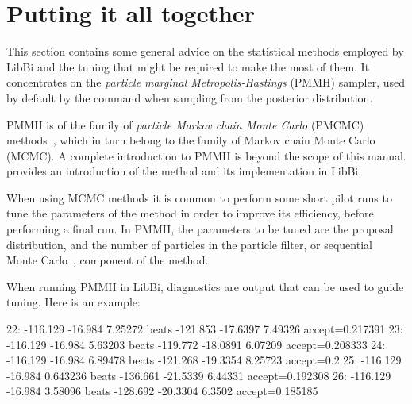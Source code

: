 \section{Putting it all together\label{Putting it all together}}

This section contains some general advice on the statistical methods employed
by LibBi and the tuning that might be required to make the most of them. It
concentrates on the \emph{particle marginal
  Metropolis-Hastings} (PMMH) sampler, used by
default by the  command when sampling from the posterior
distribution.

PMMH is of the family of \emph{particle Markov chain Monte Carlo} (PMCMC)
methods~\citep{Andrieu2010}, which in turn belong to the family of Markov
chain Monte Carlo (MCMC). A complete
introduction to PMMH is beyond the scope of this manual. \citet{Murray2013b}
provides an introduction of the method and its implementation in LibBi.

When using MCMC methods it is common to perform some short pilot runs to tune
the parameters of the method in order to improve its efficiency, before
performing a final run. In PMMH, the parameters to be tuned are the proposal
distribution, and the number of particles in the particle filter, or
sequential Monte Carlo~\citep{Doucet2001}, component of the method.

When running PMMH in LibBi, diagnostics are output that can be used to guide
tuning. Here is an example:

{\scriptsize\begin{cmdcode}
22: -116.129  -16.984  7.25272  beats -121.853  -17.6397  7.49326  accept=0.217391
23: -116.129  -16.984  5.63203  beats -119.772  -18.0891  6.07209  accept=0.208333
24: -116.129  -16.984  6.89478  beats -121.268  -19.3354  8.25723  accept=0.2
25: -116.129  -16.984  0.643236 beats -136.661  -21.5339  6.44331  accept=0.192308
26: -116.129  -16.984  3.58096  beats -128.692  -20.3304  6.3502   accept=0.185185
\end{cmdcode}}

